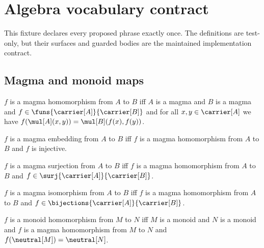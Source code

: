









\section{Algebra vocabulary contract}

This fixture declares every proposed phrase exactly once.  The definitions are
test-only, but their surfaces and guarded bodies are the maintained
implementation contract.

\subsection{Magma and monoid maps}

\begin{definition}\label{spike_phrase_magma_hom}
    $f$ is a magma homomorphism from $A$ to $B$ iff
        $A$ is a magma and $B$ is a magma and
        $f\in\funs{\carrier[A]}{\carrier[B]}$ and
        for all $x,y\in\carrier[A]$ we have
            $f(\mul[A](x,y))=\mul[B](f(x),f(y))$.
\end{definition}

\begin{definition}\label{spike_phrase_magma_embedding}
    $f$ is a magma embedding from $A$ to $B$ iff
        $f$ is a magma homomorphism from $A$ to $B$ and
        $f$ is injective.
\end{definition}

\begin{definition}\label{spike_phrase_magma_surjection}
    $f$ is a magma surjection from $A$ to $B$ iff
        $f$ is a magma homomorphism from $A$ to $B$ and
        $f\in\surj{\carrier[A]}{\carrier[B]}$.
\end{definition}

\begin{definition}\label{spike_phrase_magma_isomorphism}
    $f$ is a magma isomorphism from $A$ to $B$ iff
        $f$ is a magma homomorphism from $A$ to $B$ and
        $f\in\bijections{\carrier[A]}{\carrier[B]}$.
\end{definition}

\begin{definition}\label{spike_phrase_monoid_hom}
    $f$ is a monoid homomorphism from $M$ to $N$ iff
        $M$ is a monoid and $N$ is a monoid and
        $f$ is a magma homomorphism from $M$ to $N$ and
        $f(\neutral[M])=\neutral[N]$.
\end{definition}

